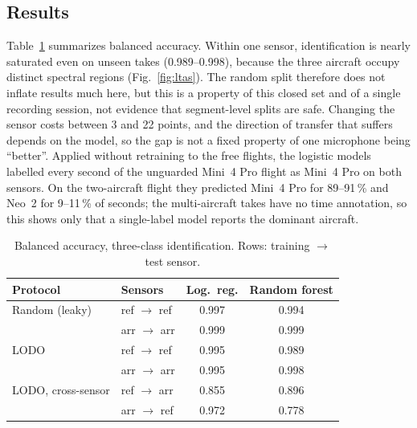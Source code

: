 \documentclass[journal]{IEEEtran}
\begin{document}
\subsection{Results}
Table~\ref{tab:baseline} summarizes balanced accuracy.
Within one sensor, identification is nearly saturated even on unseen takes (0.989--0.998), because the three aircraft occupy distinct spectral regions (Fig.~\ref{fig:ltas}).
The random split therefore does not inflate results much here, but this is a property of this closed set and of a single recording session, not evidence that segment-level splits are safe.
Changing the sensor costs between 3 and 22 points, and the direction of transfer that suffers depends on the model, so the gap is not a fixed property of one microphone being ``better''.
Applied without retraining to the free flights, the logistic models labelled every second of the unguarded Mini~4 Pro flight as Mini~4 Pro on both sensors.
On the two-aircraft flight they predicted Mini~4 Pro for 89--91\,\% and Neo~2 for 9--11\,\% of seconds; the multi-aircraft takes have no time annotation, so this shows only that a single-label model reports the dominant aircraft.

\begin{table}[t]
\caption{Balanced accuracy, three-class identification. Rows: training $\rightarrow$ test sensor.}
\label{tab:baseline}
\centering\footnotesize
\begin{tabular}{@{}llcc@{}}
\toprule
Protocol & Sensors & Log.\ reg. & Random forest \\
\midrule
Random (leaky) & ref $\rightarrow$ ref & 0.997 & 0.994 \\
 & arr $\rightarrow$ arr & 0.999 & 0.999 \\
LODO & ref $\rightarrow$ ref & 0.995 & 0.989 \\
 & arr $\rightarrow$ arr & 0.995 & 0.998 \\
LODO, cross-sensor & ref $\rightarrow$ arr & 0.855 & 0.896 \\
 & arr $\rightarrow$ ref & 0.972 & 0.778 \\
\bottomrule
\end{tabular}
\end{table}

\end{document}
